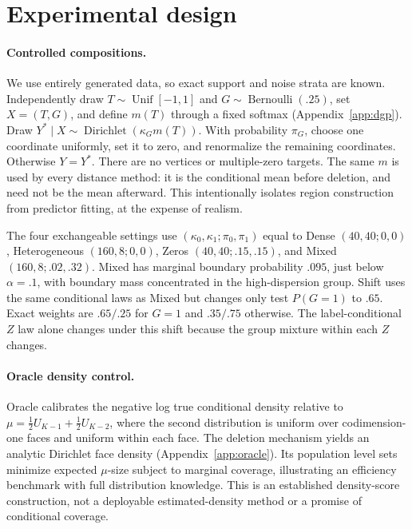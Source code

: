 \documentclass{article}
\begin{document}
\section{Experimental design}
\label{sec:design}
\paragraph{Controlled compositions.}
We use entirely generated data, so exact support and noise strata are known. Independently draw $T\sim\operatorname{Unif}[-1,1]$ and $G\sim\operatorname{Bernoulli}(.25)$, set $X=(T,G)$, and define $m(T)$ through a fixed softmax (Appendix~\ref{app:dgp}). Draw $Y^*\mid X\sim\operatorname{Dirichlet}(\kappa_Gm(T))$. With probability $\pi_G$, choose one coordinate uniformly, set it to zero, and renormalize the remaining coordinates. Otherwise $Y=Y^*$. There are no vertices or multiple-zero targets. The same $m$ is used by every distance method: it is the conditional mean before deletion, and need not be the mean afterward. This intentionally isolates region construction from predictor fitting, at the expense of realism.

The four exchangeable settings use $(\kappa_0,\kappa_1;\pi_0,\pi_1)$ equal to Dense $(40,40;0,0)$, Heterogeneous $(160,8;0,0)$, Zeros $(40,40;.15,.15)$, and Mixed $(160,8;.02,.32)$. Mixed has marginal boundary probability $.095$, just below $\alpha=.1$, with boundary mass concentrated in the high-dispersion group. Shift uses the same conditional laws as Mixed but changes only test $P(G=1)$ to $.65$. Exact weights are $.65/.25$ for $G=1$ and $.35/.75$ otherwise. The label-conditional $Z$ law alone changes under this shift because the group mixture within each $Z$ changes.

\paragraph{Oracle density control.}
Oracle calibrates the negative log true conditional density relative to $\mu=\tfrac12 U_{K-1}+\tfrac12 U_{K-2}$, where the second distribution is uniform over codimension-one faces and uniform within each face. The deletion mechanism yields an analytic Dirichlet face density (Appendix~\ref{app:oracle}). Its population level sets minimize expected $\mu$-size subject to marginal coverage, illustrating an efficiency benchmark with full distribution knowledge. This is an established density-score construction, not a deployable estimated-density method or a promise of conditional coverage.
\end{document}
